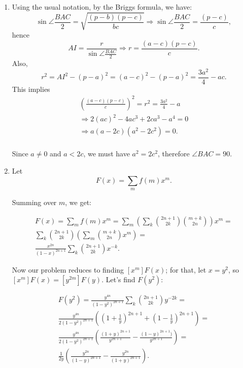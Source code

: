 \documentclass{article}
\begin{document}
\begin{enumerate}

\item Using the usual notation, by the Briggs formula, we have: 
$$
	\sin \angle \frac{BAC}{2}=\sqrt{\frac{(p-b)(p-c)}{bc}}
	\Rightarrow \sin \angle \frac{BAC}{2}=\frac{(p-c)}{c},
$$
hence
$$
	AI=\frac{r}{\sin \angle \frac{BAC}{2}}
	\Rightarrow r=\frac{(a-c)(p-c)}{c}.
$$
Also,
$$
	r^2 = AI^2 - (p-a)^2 = (a-c)^2 - (p-a)^2 = \frac{3a^2}{4} - ac.
$$
This implies
\begin{eqnarray*}
\left(\frac{(a-c)(p-c)}{c}\right)^2 = r^2 = \frac{3a^2}{4} - a \\
\Rightarrow 2(ac)^2 - 4ac^3 + 2ca^3 - a^4 = 0 \\
\Rightarrow a(a-2c)(a^2-2c^2) = 0. \\
\end{eqnarray*}

Since $a\not=0$ and $a<2c$, we must have $a^2=2c^2$,
therefore $\angle BAC=90$.

\item Let
$$
	F(x) = \sum_{m} f(m)x^m.
$$

Summing over $m$, we get:

\begin{eqnarray*}
F(x) = \sum_{m}f(m) x^{m} = \sum_{m}\left(\sum_{k} \binom{2n + 1}{2k}\binom{m + k}{2n}\right) x^{m} = \\
\sum_{k} \binom{2n + 1}{2k} \left(\sum_{m}\binom{m + k}{2n} x^{m}\right) = \\
\frac{x^{2n}}{(1 - x)^{2n + 1}} \sum_{k}\binom{2n + 1}{2k}x^{-k}.
\end{eqnarray*}

Now our problem reduces to finding $[x^{m}]F(x)$; for that,
let $x = y^{2}$, so $[x^{m}]F(x) = [y^{2m}]F(y)$. Let's find $F(y^2)$:

\begin{eqnarray*}
F(y^2) = \frac{y^{4n}}{(1 - y^2)^{2n + 1}} \sum_{k} \binom{2n + 1}{2k}y^{-2k} = \\
\frac{y^{4n}}{2(1 - y^2)^{2n + 1}}\left( \left(1 + \frac{1}{y}\right)^{2n + 1} + \left(1 - \frac{1}{y}\right)^{2n + 1} \right) = \\
\frac{y^{4n}}{2(1 - y^2)^{2n + 1}}\left(\frac{(1 + y)^{2n + 1}}{y^{2n + 1}} - \frac{(1 - y)^{2n + 1})}{y^{2n + 1}} \right) = \\
\frac{1}{2y}\left(\frac{y^{2n}}{(1 - y)^{2n + 1}} - \frac{y^{2n}}{(1 + y)^{2n + 1}}\right).
\end{eqnarray*}


\end{enumerate}
\end{document}

